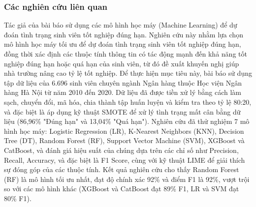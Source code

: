 \subsubsection{Các nghiên cứu liên quan}
Tác giả của bài báo \cite{2023} sử dụng các mô hình học máy (Machine Learning) để dự đoán tình trạng sinh viên tốt nghiệp đúng hạn. Nghiên cứu này nhằm lựa chọn mô hình học máy tối ưu để dự đoán tình trạng sinh viên tốt nghiệp đúng hạn, đồng thời xác định các thuộc tính thông tin có tác động mạnh đến khả năng tốt nghiệp đúng hạn hoặc quá hạn của sinh viên, từ đó đề xuất khuyến nghị giúp nhà trường nâng cao tỷ lệ tốt nghiệp. Để thực hiện mục tiêu này, bài báo sử dụng tập dữ liệu của 6.696 sinh viên chuyên ngành Ngân hàng thuộc Học viện Ngân hàng Hà Nội từ năm 2010 đến 2020. Dữ liệu đã được tiền xử lý bằng cách làm sạch, chuyển đổi, mã hóa, chia thành tập huấn luyện và kiểm tra theo tỷ lệ 80:20, và đặc biệt là áp dụng kỹ thuật SMOTE để xử lý tình trạng mất cân bằng dữ liệu (86,96\% "Đúng hạn" và 13,04\% "Quá hạn"). Nghiên cứu đã thử nghiệm 7 mô hình học máy: Logistic Regression (LR), K-Nearest Neighbors (KNN), Decision Tree (DT), Random Forest (RF), Support Vector Machine (SVM), XGBoost và CatBoost, và đánh giá hiệu suất của chúng dựa trên các chỉ số như Precision, Recall, Accuracy, và đặc biệt là F1 Score, cùng với kỹ thuật LIME để giải thích sự đóng góp của các thuộc tính. Kết quả nghiên cứu cho thấy Random Forest (RF) là mô hình tối ưu nhất, đạt độ chính xác 92\% và điểm F1 là 92\%, vượt trội so với các mô hình khác (XGBoost và CatBoost đạt 89\% F1, LR và SVM đạt 80\% F1).


